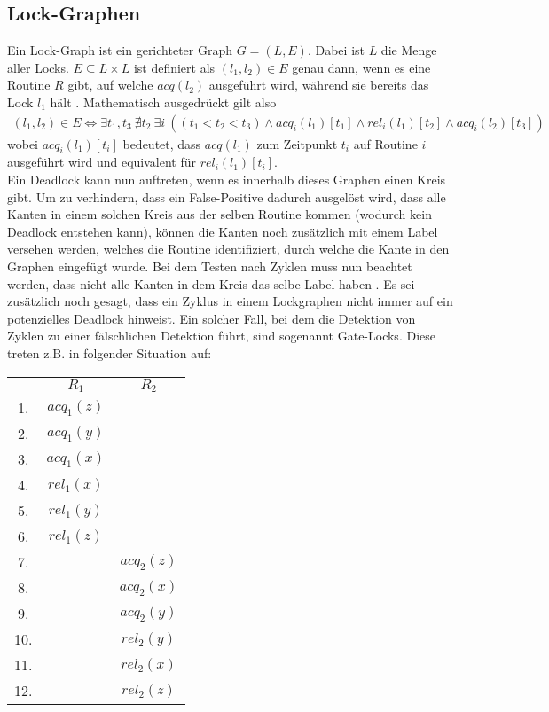 \subsection{Lock-Graphen}
Ein Lock-Graph ist ein gerichteter Graph $G = (L, E)$. Dabei ist $L$ die Menge 
aller Locks. $E \subseteq L \times L$ ist definiert als $(l_1, l_2) \in E$ genau 
dann, wenn es eine Routine $R$ gibt, auf welche $acq(l_2)$ ausgeführt wird, während sie 
bereits das Lock $l_1$ hält \cite{bensalem}. Mathematisch ausgedrückt gilt also 
\begin{align*}
    (l_1, l_2) \in E \Leftrightarrow \exists t_1, t_3\ \nexists t_2\ \exists i\ ((t_1 < t_2 < t_3) \land acq_i(l_1)[t_1] \land rel_i(l_1)[t_2] \land  acq_i(l_2)[t_3])
\end{align*}
wobei $acq_i(l_1)[t_i]$ bedeutet, dass $acq(l_1)$ zum Zeitpunkt $t_i$ auf Routine 
$i$ ausgeführt wird und equivalent für $rel_i(l_1)[t_i]$.\\
Ein Deadlock kann nun auftreten, wenn es innerhalb dieses Graphen einen Kreis 
gibt. Um zu verhindern, dass ein False-Positive dadurch ausgelöst wird, dass 
alle Kanten in einem solchen Kreis aus der selben Routine kommen (wodurch kein 
Deadlock entstehen kann), können die Kanten noch zusätzlich mit einem Label 
versehen werden, welches die Routine identifiziert, durch welche die Kante in 
den Graphen eingefügt wurde. Bei dem Testen nach Zyklen muss nun beachtet 
werden, dass nicht alle Kanten in dem Kreis das selbe Label haben 
\cite{bensalem}. Es sei zusätzlich noch gesagt, dass ein Zyklus in einem 
Lockgraphen nicht immer auf ein potenzielles Deadlock hinweist. Ein solcher 
Fall, bei dem die Detektion von Zyklen zu einer fälschlichen Detektion 
führt, sind sogenannt Gate-Locks. Diese treten z.B. in folgender Situation
auf:
\begin{table}[H]
     \centering
     \begin{tabular}{ccc}
        & $R_1$        & $R_2$          \\
     1. & $acq_{1}(z)$ &                \\
     2. & $acq_{1}(y)$ &                \\
     3. & $acq_{1}(x)$ &                \\
     4. & $rel_{1}(x)$ &                \\
     5. & $rel_{1}(y)$ &                \\
     6. & $rel_{1}(z)$ &                \\
     7. &              & $acq_{2}(z)$ \\
     8. &              & $acq_{2}(x)$ \\
     9. &              & $acq_{2}(y)$ \\
    10. &              & $rel_{2}(y)$ \\
    11. &              & $rel_{2}(x)$ \\
    12. &              & $rel_{2}(z)$
    \end{tabular}
\end{table}
